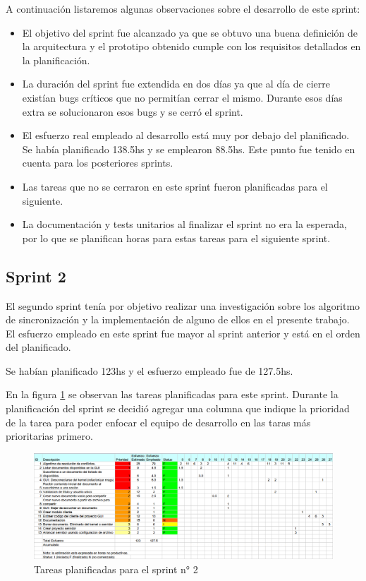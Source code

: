 \documentclass[12pt,a4paper]{article}
\begin{document}
A continuación listaremos algunas observaciones sobre el desarrollo de este sprint:

\begin{itemize}
\item El objetivo del sprint fue alcanzado ya que se obtuvo una buena definición de la arquitectura y el prototipo
obtenido cumple con los requisitos detallados en la planificación.
\item La duración del sprint fue extendida en dos días ya que al día de cierre existían bugs críticos que no permitían
cerrar el mismo. Durante esos días extra se solucionaron esos bugs y se cerró el sprint.
\item El esfuerzo real empleado al desarrollo está muy por debajo del planificado. Se había planificado 138.5hs y se
emplearon 88.5hs. Este punto fue tenido en cuenta para los posteriores sprints.
\item Las tareas que no se cerraron en este sprint fueron planificadas para el siguiente.
\item La documentación y tests unitarios al finalizar el sprint no era la esperada, por lo que se planifican
horas para estas tareas para el siguiente sprint.
\end{itemize}

\subsection{Sprint 2}

El segundo sprint tenía por objetivo realizar una investigación sobre los algoritmo de sincronización y la implementación
de alguno de ellos en el presente trabajo. El esfuerzo empleado en este sprint fue mayor al sprint anterior y está
en el orden del planificado.

Se habían planificado 123hs y el esfuerzo empleado fue de 127.5hs.

En la figura \ref{sprint2-tareas} se observan las tareas planificadas para este sprint. Durante la planificación del
sprint se decidió agregar una columna que indique la prioridad de la tarea para poder enfocar el equipo de desarrollo
en las taras más prioritarias primero.

	\begin{figure}[!ht]
		\begin{center}
			\includegraphics[width=14cm]{sprint2.png}
			\caption{\label{sprint2-tareas} Tareas planificadas para el sprint n° 2 }
		\end{center}
	\end{figure}
\end{document}
